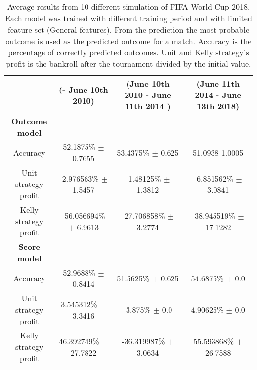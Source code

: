 \begin{sidewaystable}
    \caption{Average results from 10 different simulation of FIFA World Cup 2018. Each model was trained with different training period and with limited feature set (General features). From the prediction the most probable outcome is used as the predicted outcome for a match. Accuracy is the percentage of correctly predicted outcomes. Unit and Kelly strategy's profit is the bankroll after the tournament divided by the initial value.}
    \begin{tabular}{ | c |c| c | c |}
    \hline
    & (- June 10th 2010) & (June 10th 2010 - June 11th 2014 ) & (June 11th 2014 - June 13th 2018) \\
    \hline
    \textbf{Outcome model} \\
    \hline
    Accuracy & 52.1875\% $\pm$ 0.7655 & 53.4375\% $\pm$ 0.625 & 51.0938 1.0005 \\
    Unit strategy profit& -2.976563\% $\pm$ 1.5457 & -1.48125\% $\pm$ 1.3812 & -6.851562\% $\pm$ 3.0841 \\
    Kelly strategy profit& -56.056694\% $\pm$ 6.9613 & -27.706858\% $\pm$ 3.2774 & -38.945519\% $\pm$ 17.1282 \\
    \hline
    \textbf{Score model} \\
    \hline
    Accuracy & 52.9688\% $\pm$ 0.8414 & 51.5625\% $\pm$ 0.625 & 54.6875\% $\pm$ 0.0 \\
    Unit strategy profit& 3.545312\% $\pm$ 3.3416 & -3.875\% $\pm$ 0.0 & 4.90625\% $\pm$ 0.0 \\
    Kelly strategy profit& 46.392749\% $\pm$ 27.7822 & -36.319987\% $\pm$ 3.0634 & 55.593868\% $\pm$ 26.7588 \\
    \hline
   \end{tabular}
\end{sidewaystable}